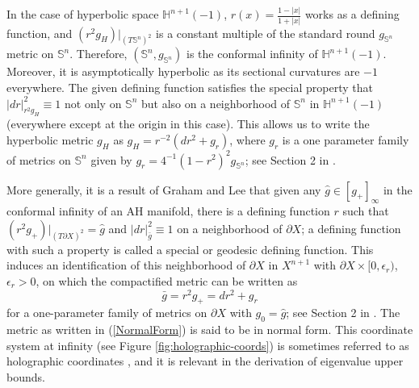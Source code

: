 \documentclass{amsart}
\newcommand{\Hyp}{\mathbb{H}^{n+1}(-1)}
\begin{document}
In the case of hyperbolic space $\Hyp$, $r(x) =\frac{1-|x|}{1+|x|}$ works as a defining function, and $(r^2g_H)|_{(T\mathbb{S}^n)^2}$ is a constant multiple of the standard round $g_{\mathbb{S}^n}$ metric on $\mathbb{S}^n$. Therefore, $(\mathbb{S}^n,g_{\mathbb{S}^n})$ is the conformal infinity of $\Hyp$. Moreover, it is asymptotically hyperbolic as its sectional curvatures are $-1$ everywhere. The given defining function satisfies the special property that $|dr|^2_{r^2g_H} \equiv 1$ not only on $\mathbb{S}^n$ but also on a neighborhood of $\mathbb{S}^n$ in $\Hyp$ (everywhere except at the origin in this case). This allows us to write the hyperbolic metric $g_H$ as $g_H = r^{-2}(dr^2+g_r)$, where $g_r$ is a one parameter family of metrics on $\mathbb{S}^n$ given by $g_r = 4^{-1}(1-r^2)^2g_{\mathbb{S}^n}$; see Section 2 in \cite{Graham}. 



More generally, it is a result of Graham and Lee \cite{GrahamLee} that given any $\hat g\in [g_+]_{\infty}$ in the conformal infinity of an AH manifold, there is a defining function $r$ such that $(r^2g_+)|_{(T\partial X)^2} = \hat g$ and $|dr|^2_{\bar g}\equiv 1$ on a neighborhood of $\partial X$; a defining function with such a property is called a special or geodesic defining function.  This induces an identification of this neighborhood of $\partial X$ in $X^{n+1}$ with $\partial X\times [0,\epsilon_r)$, $\epsilon_r>0$, on which the compactified metric can be written as 
\begin{equation}\label{NormalForm}
\bar g = r^2g_+ = dr^2+g_r
\end{equation}
for a one-parameter family of metrics on $\partial X$ with $g_0 = \hat g$; see Section 2 in \cite{Perez-AyalaSamuel2025HaCc}. The metric as written in (\ref{NormalForm}) is said to be in normal form.  This coordinate system at infinity (see Figure \ref{fig:holographic-coords}) is sometimes referred to as holographic coordinates \cite{Perez-AyalaSamuel2025HaCc}, and it is relevant in the derivation of eigenvalue upper bounds. 
\end{document}
